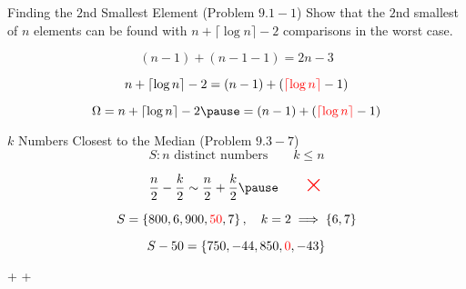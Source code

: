 
\begin{frame}{}
  \begin{exampleblock}{Finding the $2$nd Smallest Element (Problem $9.1-1$)}
    Show that the $2$nd smallest of $n$ elements can be found with $n + \lceil \log n \rceil - 2$
    comparisons in the worst case.
  \end{exampleblock}

  \pause
  \[
    (n-1) + (n-1-1) = 2n-3
  \]
\end{frame}

\begin{frame}{}
  \[
    n + \lceil \log n \rceil - 2 = (n-1) + (\textcolor{red}{\lceil \log n \rceil} - 1)
  \]

  \pause
  \begin{adjustbox}{max totalsize={.7\textwidth}{.6\textheight},center}
    
  \end{adjustbox}


\end{frame}

\begin{frame}{}
  \[
    \Omega = n + \lceil \log n \rceil - 2 \pause = (n-1) + (\red{\lceil \log n \rceil} - 1)
  \]

  \pause
  \centerline{}
\end{frame}

\begin{frame}{}
  \begin{exampleblock}{$k$ Numbers Closest to the Median (Problem $9.3-7$)}
    \[
      S: n \text{ distinct numbers} \qquad k \le n
    \]
  \end{exampleblock}

  \pause
  \[
    \frac{n}{2} - \frac{k}{2} \sim \frac{n}{2} + \frac{k}{2} \pause \qquad \scalebox{2}{\red{$\times$}}
  \]

  \pause
  \[
    S = \left\{800, 6, 900, \textcolor{red}{50}, 7\right\}, \quad k = 2 \implies \left\{6,7\right\}
  \]

  \pause
  \[
    S - 50 = \left\{750, -44, 850, \textcolor{red}{0}, -43\right\}
  \]

  \pause
  \vspace{0.50cm}
  \centerline{ +  + }
\end{frame}
